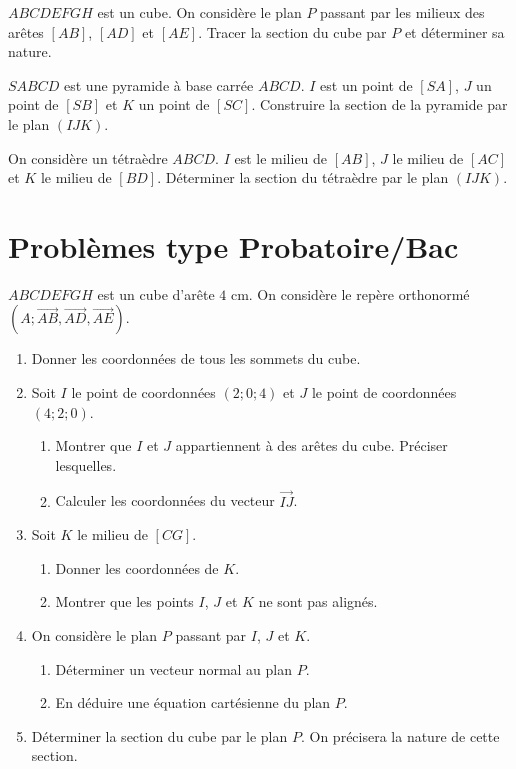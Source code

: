 
\exo{}
$ABCDEFGH$ est un cube. On considère le plan $P$ passant par les milieux des arêtes $[AB]$, $[AD]$ et $[AE]$. Tracer la section du cube par $P$ et déterminer sa nature.

\exo{}
$SABCD$ est une pyramide à base carrée $ABCD$. $I$ est un point de $[SA]$, $J$ un point de $[SB]$ et $K$ un point de $[SC]$. Construire la section de la pyramide par le plan $(IJK)$.

\exo{}
On considère un tétraèdre $ABCD$. $I$ est le milieu de $[AB]$, $J$ le milieu de $[AC]$ et $K$ le milieu de $[BD]$. Déterminer la section du tétraèdre par le plan $(IJK)$.

\section{Problèmes type Probatoire/Bac}

$ABCDEFGH$ est un cube d'arête $4$ cm. On considère le repère orthonormé $(A;\vec{AB},\vec{AD},\vec{AE})$.
\begin{enumerate}[label=\arabic*)]
\item Donner les coordonnées de tous les sommets du cube.
\item Soit $I$ le point de coordonnées $(2;0;4)$ et $J$ le point de coordonnées $(4;2;0)$.
\begin{enumerate}[label=\alph*)]
\item Montrer que $I$ et $J$ appartiennent à des arêtes du cube. Préciser lesquelles.
\item Calculer les coordonnées du vecteur $\overrightarrow{IJ}$.
\end{enumerate}
\item Soit $K$ le milieu de $[CG]$.
\begin{enumerate}[label=\alph*)]
\item Donner les coordonnées de $K$.
\item Montrer que les points $I$, $J$ et $K$ ne sont pas alignés.
\end{enumerate}
\item On considère le plan $P$ passant par $I$, $J$ et $K$.
\begin{enumerate}[label=\alph*)]
\item Déterminer un vecteur normal au plan $P$.
\item En déduire une équation cartésienne du plan $P$.
\end{enumerate}
\item Déterminer la section du cube par le plan $P$. On précisera la nature de cette section.
\end{enumerate}

